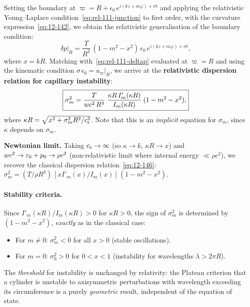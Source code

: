 Setting the boundary at $\varpi = R + \epsilon_{0}\,
e^{i(kz+m\varphi)+\sigma t}$ and applying the relativistic
Young--Laplace condition~\eqref{eq:rel-111-junction} to first
order, with the curvature expression~\eqref{eq:12-142}, we obtain
the relativistic generalisation of the boundary condition:
\begin{equation}
\label{eq:rel-111-bc}
\delta p\big|_{R} = \frac{T}{R^{2}}\,
  (1 - m^{2} - x^{2})\,\epsilon_{0}\,e^{i(kz+m\varphi)+\sigma t},
\end{equation}
where $x = kR$.  Matching with~\eqref{eq:rel-111-deltap} evaluated
at $\varpi = R$ and using the kinematic condition
$\sigma\,\epsilon_{0} = u_{\varpi}\big|_{R}$, we arrive at
the \textbf{relativistic dispersion relation for capillary
instability}:
\begin{equation}
\boxed{
\label{eq:rel-111-dispersion}
\sigma_{m}^{2} = \frac{T}{w c^{2}\,R^{3}}\;
  \frac{\kappa R\,I'_{m}(\kappa R)}{I_{m}(\kappa R)}\;
  (1 - m^{2} - x^{2}),
}
\end{equation}
where $\kappa R = \sqrt{x^{2} + \sigma_{m}^{2}R^{2}/c_{\mathrm{s}}^{2}}$.
Note that this is an \emph{implicit} equation for $\sigma_{m}$,
since $\kappa$ depends on $\sigma_{m}$.

\begin{relcorrection}
\textbf{Newtonian limit.}
Taking $c_{\mathrm{s}} \to \infty$ (so $\kappa \to k$, $\kappa R \to x$) and
$w c^{2} \to \varepsilon_{0} + p_{0} \to \rho c^{2}$
(non-relativistic limit where internal energy $\ll \rho c^{2}$),
we recover the classical dispersion
relation~\eqref{eq:12-146}:
$\sigma_{m}^{2} = (T/\rho R^{3})\,
[x I'_{m}(x)/I_{m}(x)]\,(1 - m^{2} - x^{2})$.
\end{relcorrection}

\paragraph{Stability criteria.}
Since $I'_{m}(\kappa R)/I_{m}(\kappa R) > 0$ for $\kappa R > 0$,
the sign of $\sigma_{m}^{2}$ is determined by $(1-m^{2}-x^{2})$,
\emph{exactly} as in the classical case:
\begin{itemize}
\item For $m \neq 0$: $\sigma_{m}^{2} < 0$ for all $x > 0$
  (stable oscillations).
\item For $m = 0$: $\sigma_{0}^{2} > 0$ for $0 < x < 1$
  (instability for wavelengths $\lambda > 2\pi R$).
\end{itemize}
The \emph{threshold} for instability is unchanged by relativity:
the Plateau criterion that a cylinder is unstable to axisymmetric
perturbations with wavelength exceeding its circumference is a purely
\emph{geometric} result, independent of the equation of state.

